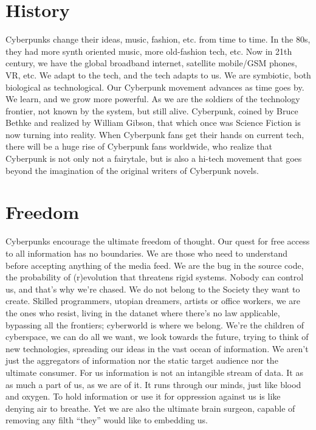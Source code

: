 \documentclass[letterpaper,12pt,english]{sphinxmanual}
\begin{document}
\section{History}
\label{2007:history}
Cyberpunks change their ideas, music, fashion, etc. from time to time. In the 80s, they had more synth oriented music, more old-fashion tech, etc. Now in 21th century, we have the global broadband internet, satellite mobile/GSM phones, VR, etc. We adapt to the tech, and the tech adapts to us. We are symbiotic, both biological as technological. Our Cyberpunk movement advances as time goes by. We learn, and we grow more powerful. As we are the soldiers of the technology frontier, not known by the system, but still alive. Cyberpunk, coined by Bruce Bethke and realized by William Gibson, that which once was Science Fiction is now turning into reality. When Cyberpunk fans get their hands on current tech, there will be a huge rise of Cyberpunk fans worldwide, who realize that Cyberpunk is not only not a fairytale, but is also a hi-tech movement that goes beyond the imagination of the original writers of Cyberpunk novels.


\section{Freedom}
\label{2007:freedom}
Cyberpunks encourage the ultimate freedom of thought. Our quest for free access to all information has no boundaries. We are those who need to understand before accepting anything of the media feed. We are the bug in the source code, the probability of (r)evolution that threatens rigid systems. Nobody can control us, and that's why we're chased. We do not belong to the Society they want to create. Skilled programmers, utopian dreamers, artists or office workers, we are the ones who resist, living in the datanet where there's no law applicable, bypassing all the frontiers; cyberworld is where we belong. We're the children of cyberspace, we can do all we want, we look towards the future, trying to think of new technologies, spreading our ideas in the vast ocean of information. We aren't just the aggregators of information nor the static target audience nor the ultimate consumer. For us information is not an intangible stream of data. It as as much a part of us, as we are of it. It runs through our minds, just like blood and oxygen. To hold information or use it for oppression against us is like denying air to breathe. Yet we are also the ultimate brain surgeon, capable of removing any filth ``they'' would like to embedding us.
\end{document}
